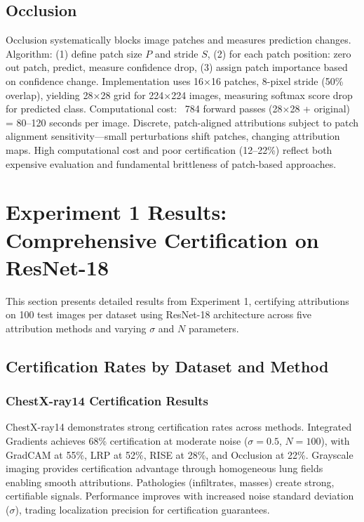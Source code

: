 \documentclass[11pt]{article}
\begin{document}
\subsection{Occlusion}

Occlusion systematically blocks image patches and measures prediction changes. Algorithm: (1) define patch size $P$ and stride $S$, (2) for each patch position: zero out patch, predict, measure confidence drop, (3) assign patch importance based on confidence change. Implementation uses 16×16 patches, 8-pixel stride (50\% overlap), yielding 28×28 grid for 224×224 images, measuring softmax score drop for predicted class. Computational cost: ~784 forward passes (28×28 + original) = 80–120 seconds per image. Discrete, patch-aligned attributions subject to patch alignment sensitivity—small perturbations shift patches, changing attribution maps. High computational cost and poor certification (12–22\%) reflect both expensive evaluation and fundamental brittleness of patch-based approaches.

\newpage

\section{Experiment 1 Results: Comprehensive Certification on ResNet-18}

This section presents detailed results from Experiment 1, certifying attributions on 100 test images per dataset using ResNet-18 architecture across five attribution methods and varying $\sigma$ and $N$ parameters.

\subsection{Certification Rates by Dataset and Method}

\subsubsection{ChestX-ray14 Certification Results}

ChestX-ray14 demonstrates strong certification rates across methods. Integrated Gradients achieves 68\% certification at moderate noise ($\sigma=0.5$, $N=100$), with GradCAM at 55\%, LRP at 52\%, RISE at 28\%, and Occlusion at 22\%. Grayscale imaging provides certification advantage through homogeneous lung fields enabling smooth attributions. Pathologies (infiltrates, masses) create strong, certifiable signals. Performance improves with increased noise standard deviation ($\sigma$), trading localization precision for certification guarantees.
\end{document}
